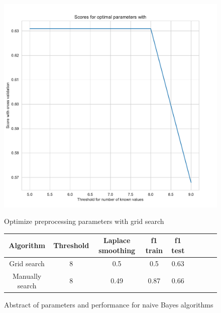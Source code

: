 \documentclass[11pt]{article}
\begin{document}
\begin{figure}
\begin{minipage}[t]{0.3\textwidth}
\includegraphics[width=1\linewidth]{bridges/threshold_grid_nb1.pdf}
\caption{Optimize preprocessing parameters with grid search}
\label{Fig:: NB_treshhold_grid}
\end{minipage}
\begin{minipage}[t]{0.7\textwidth}
\centering
  \begin{tabular}{ | c | c | c | c | c | c | c | c | c |}
        \hline
    Algorithm & Threshold & Laplace smoothing & f1 train & f1 test \\   
    \hline
    Grid search & 8 & 0.5 & 0.5 & 0.63 \\ \hline
    Manually search & 8 & 0.49 & 0.87 & 0.66\\
    \hline
    \end{tabular}
    \caption{Abstract of parameters and performance for naive Bayes algorithms}
    \label{tab_bridges2}
\end{minipage}
\end{figure}
\end{document}
